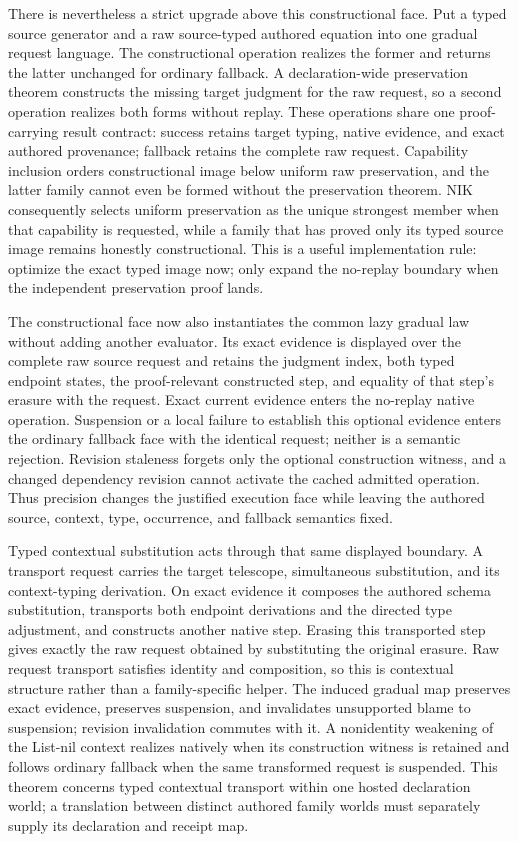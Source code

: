 \documentclass[11pt]{article}
\begin{document}
There is nevertheless a strict upgrade above this constructional face.  Put a
typed source generator and a raw source-typed authored equation into one
gradual request language.  The constructional operation realizes the former
and returns the latter unchanged for ordinary fallback.  A declaration-wide
preservation theorem constructs the missing target judgment for the raw
request, so a second operation realizes both forms without replay.  These
operations share one proof-carrying result contract: success retains target
typing, native evidence, and exact authored provenance; fallback retains the
complete raw request.  Capability inclusion orders constructional image below
uniform raw preservation, and the latter family cannot even be formed without
the preservation theorem.  NIK consequently selects uniform preservation as
the unique strongest member when that capability is requested, while a family
that has proved only its typed source image remains honestly constructional.
This is a useful implementation rule: optimize the exact typed image now; only
expand the no-replay boundary when the independent preservation proof lands.

The constructional face now also instantiates the common lazy gradual law
without adding another evaluator.  Its exact evidence is displayed over the
complete raw source request and retains the judgment index, both typed endpoint
states, the proof-relevant constructed step, and equality of that step's
erasure with the request.  Exact current evidence enters the no-replay native
operation.  Suspension or a local failure to establish this optional evidence
enters the ordinary fallback face with the identical request; neither is a
semantic rejection.  Revision staleness forgets only the optional construction
witness, and a changed dependency revision cannot activate the cached admitted
operation.  Thus precision changes the justified execution face while leaving
the authored source, context, type, occurrence, and fallback semantics fixed.

Typed contextual substitution acts through that same displayed boundary.  A
transport request carries the target telescope, simultaneous substitution, and
its context-typing derivation.  On exact evidence it composes the authored
schema substitution, transports both endpoint derivations and the directed
type adjustment, and constructs another native step.  Erasing this transported
step gives exactly the raw request obtained by substituting the original
erasure.  Raw request transport satisfies identity and composition, so this is
contextual structure rather than a family-specific helper.  The induced gradual
map preserves exact evidence, preserves suspension, and invalidates unsupported
blame to suspension; revision invalidation commutes with it.  A nonidentity
weakening of the List-nil context realizes natively when its construction
witness is retained and follows ordinary fallback when the same transformed
request is suspended.  This theorem concerns typed contextual transport within
one hosted declaration world; a translation between distinct authored family
worlds must separately supply its declaration and receipt map.
\end{document}
